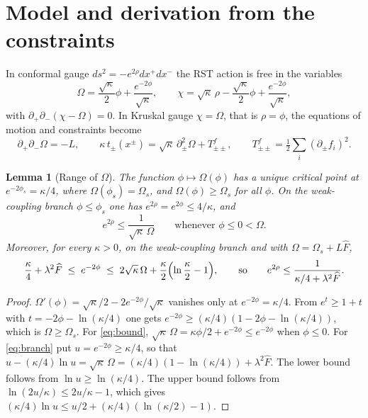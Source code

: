 \documentclass[11pt]{article}
\newtheorem{lemma}{Lemma}
\theoremstyle{remark}
\newcommand{\Fh}{\widehat F}
\begin{document}
\section{Model and derivation from the constraints}\label{sec:model}

In conformal gauge $ds^2=-e^{2\rho}dx^+dx^-$ the RST action is free in the variables \cite{RST,KimSon}
\[
\Omega=\frac{\sqrt\kappa}{2}\phi+\frac{e^{-2\phi}}{\sqrt\kappa},\qquad \chi=\sqrt\kappa\,\rho-\frac{\sqrt\kappa}{2}\phi+\frac{e^{-2\phi}}{\sqrt\kappa},
\]
with $\partial_+\partial_-(\chi-\Omega)=0$. In Kruskal gauge $\chi=\Omega$, that is $\rho=\phi$, the equations of motion and constraints become
\begin{equation}\label{eq:eom}
\partial_+\partial_-\Omega=-L,\qquad \kappa\,t_\pm(x^\pm)=\sqrt\kappa\,\partial_\pm^2\Omega+T^f_{\pm\pm},\qquad T^f_{\pm\pm}=\tfrac12\sum_i(\partial_\pm f_i)^2 .
\end{equation}

\begin{lemma}[Range of $\Omega$]\label{lem:omega}
The function $\phi\mapsto\Omega(\phi)$ has a unique critical point at $e^{-2\phi_s}=\kappa/4$, where $\Omega(\phi_s)=\Omega_s$, and $\Omega(\phi)\ge\Omega_s$ for all $\phi$. On the weak-coupling branch $\phi\le\phi_s$ one has $e^{2\rho}=e^{2\phi}\le 4/\kappa$, and
\begin{equation}\label{eq:bound}
e^{2\rho}\le\frac{1}{\sqrt\kappa\,\Omega}\qquad\text{whenever }\phi\le0<\Omega .
\end{equation}
Moreover, for every $\kappa>0$, on the weak-coupling branch and with $\Omega=\Omega_s+L\Fh$,
\begin{equation}\label{eq:branch}
\frac\kappa4+\lambda^2\Fh\;\le\;e^{-2\phi}\;\le\;2\sqrt\kappa\,\Omega+\frac\kappa2\Bigl(\ln\frac\kappa2-1\Bigr),
\qquad\text{so}\qquad e^{2\rho}\le\frac{1}{\kappa/4+\lambda^2\Fh}.
\end{equation}
\end{lemma}
\begin{proof}
$\Omega'(\phi)=\sqrt\kappa/2-2e^{-2\phi}/\sqrt\kappa$ vanishes only at $e^{-2\phi}=\kappa/4$. From $e^{t}\ge1+t$ with $t=-2\phi-\ln(\kappa/4)$ one gets $e^{-2\phi}\ge(\kappa/4)(1-2\phi-\ln(\kappa/4))$, which is $\Omega\ge\Omega_s$. For \eqref{eq:bound}, $\sqrt\kappa\,\Omega=\kappa\phi/2+e^{-2\phi}\le e^{-2\phi}$ when $\phi\le0$. For \eqref{eq:branch} put $u=e^{-2\phi}\ge\kappa/4$, so that $u-(\kappa/4)\ln u=\sqrt\kappa\,\Omega=(\kappa/4)(1-\ln(\kappa/4))+\lambda^2\Fh$. The lower bound follows from $\ln u\ge\ln(\kappa/4)$. The upper bound follows from $\ln(2u/\kappa)\le2u/\kappa-1$, which gives $(\kappa/4)\ln u\le u/2+(\kappa/4)(\ln(\kappa/2)-1)$.
\end{proof}
\end{document}
